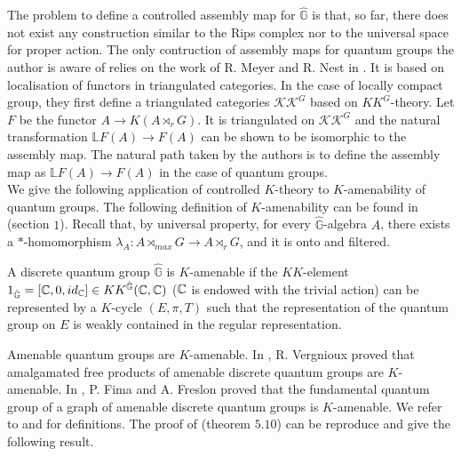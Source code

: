 The problem to define a controlled assembly map for $\hat{\mathbb G}$ is that, so far, there does not exist any construction similar to the Rips complex nor to the universal space for proper action. The only contruction of assembly maps for quantum groups the author is aware of relies on the work of R. Meyer and R. Nest in \cite{MeyerNest}. It is based on localisation of functors in triangulated categories. In the case of locally compact group, they first define a triangulated categories $\mathcal {KK}^G$ based on $KK^G$-theory. Let $F$ be the functor $A\rightarrow K(A \rtimes_r G)$. It is triangulated on $\mathcal {KK}^G$ and the natural transformation $\mathbb L F(A)\rightarrow F(A)$ can be shown to be isomorphic to the assembly map. The natural path taken by the authors is to define the assembly map as $\mathbb L F(A)\rightarrow F(A)$ in the case of quantum groups.\\

We give the following application of controlled $K$-theory to $K$-amenability of quantum groups. The following definition of $K$-amenability can be found in \cite{VergniouxKamenability} (section $1$). Recall that, by universal property, for every $\hat{\mathbb G}$-algebra $A$, there exists a $*$-homomorphism $\lambda_A : A\rtimes_{max} G \rightarrow A\rtimes_{r} G$, and it is onto and filtered.

\begin{definition}
A discrete quantum group $\hat{\mathbb G}$ is $K$-amenable if the $KK$-element $1_{\hat{\mathbb G}} = [\mathbb C, 0, id_\mathbb C]\in KK^{\hat{\mathbb G}}(\mathbb C,\mathbb C)$ ($\mathbb C$ is endowed with the trivial action) can be represented by a $K$-cycle $(E,\pi,T)$ such that the representation of the quantum group on $E$ is weakly contained in the regular representation.
\end{definition}

Amenable quantum groups are $K$-amenable. In \cite{VergniouxKamenability}, R. Vergnioux proved that amalgamated free products of amenable discrete quantum groups are $K$-amenable. In \cite{FimaGraphs}, P. Fima and A. Freslon proved that the fundamental quantum group of a graph of amenable discrete quantum groups is $K$-amenable. We refer to \cite{VergniouxKamenability} and \cite{FimaGraphs} for definitions. The proof of \cite{OY2} (theorem $5.10$) can be reproduce and give the following result.

